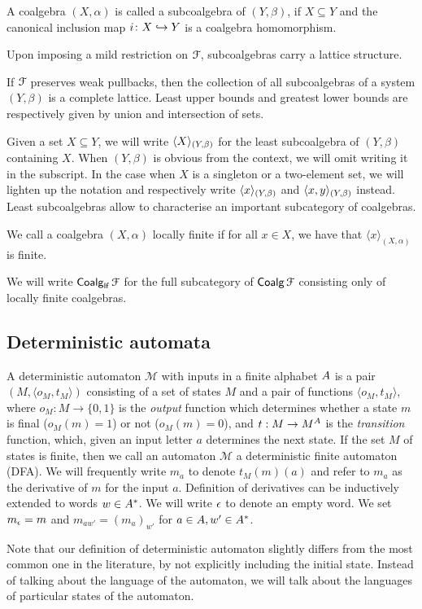 \begin{definition}\label{c2:def:subcoalgebra}
A coalgebra $(X, \alpha)$ is called a subcoalgebra of $(Y, \beta)$, if $X \subseteq Y$ and the canonical inclusion map $i \colon X \hookrightarrow Y$ is a coalgebra homomorphism.	
\end{definition}
Upon imposing a mild restriction on $\mathcal{F}$, subcoalgebras carry a lattice structure.
\begin{lemma}\label{c2:lem:subcoalgebras_lattice}
If $\mathcal{F}$ preserves weak pullbacks, then the collection of all subcoalgebras of a system $(Y, \beta)$ is a complete lattice. Least upper bounds and greatest lower bounds are respectively given by union and intersection of sets. 
\end{lemma}
Given a set $X \subseteq Y$, we will write $\langle X \rangle_{(Y, \beta)}$ for the least subcoalgebra of $(Y, \beta)$ containing $X$.	 When $(Y, \beta)$ is obvious from the context, we will omit writing it in the subscript.
In the case when $X$ is a singleton or a two-element set, we will lighten up the notation and respectively write $\langle x \rangle_{(Y, \beta)}$ and $\langle x,y \rangle_{(Y, \beta)}$ instead. Least subcoalgebras allow to characterise an important subcategory of coalgebras.
\begin{definition}\label{c2:def:locally_finite}
We call a coalgebra $(X, \alpha)$ locally finite if for all $x \in X$, we have that $\langle x \rangle_{(X, \alpha)}$ is finite.		
\end{definition}
We will write $\mathop{\mathsf{Coalg}_{\mathsf{lf}}}{\mathcal{F}}$ for the full subcategory of $\mathop{\mathsf{Coalg}}{\mathcal{F}}$ consisting only of locally finite coalgebras.
\subsection{Deterministic automata}\label{c2:subsec:deterministic_automata}
A deterministic automaton $\mathcal{M}$ with inputs in a finite alphabet ${A}$ is a pair $(M, \langle o_M , t_M \rangle)$ consisting of a set of states $M$ and a pair of functions $\langle o_M, t_M \rangle$, where $o_M \colon M \to \{0,1\}$ is the \emph{output} function which determines whether a state $m$ is final ($o_M(m)=1$) or not ($o_M(m)=0$), and $t :M \to M^{A}$ is the \emph{transition} function, which, given an input letter $a$ determines the next state. If the set $M$ of states is finite, then we call an automaton $\mathcal{M}$ a deterministic finite automaton (DFA). We will frequently write $m_a$ to denote $t_M(m)(a)$ and refer to $m_a$ as the derivative of $m$ for the input $a$. Definition of derivatives can be inductively extended to words $w \in {A}^{\ast}$. We will write $\epsilon$ to denote an empty word. We set $m_{\epsilon} = m$ and $m_{aw'} = (m_a)_{w'}$ for $a \in {A}, w' \in {A}^\ast$.
\begin{remark}\label{c2:rem:automata_as_coalgebras}
Note that our definition of deterministic automaton slightly differs from the most common one in the literature, by not explicitly including the initial state. Instead of talking about the language of the automaton, we will talk about the languages of particular states of the automaton. 	
\end{remark}



